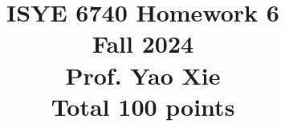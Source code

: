 \documentclass[twoside,10pt]{article}
\begin{document}
\title{ISYE 6740 Homework 6 \\ 
Fall 2024\\ 
Prof. Yao Xie\\
 Total 100 points}
\date{}
\maketitle





\end{document}
